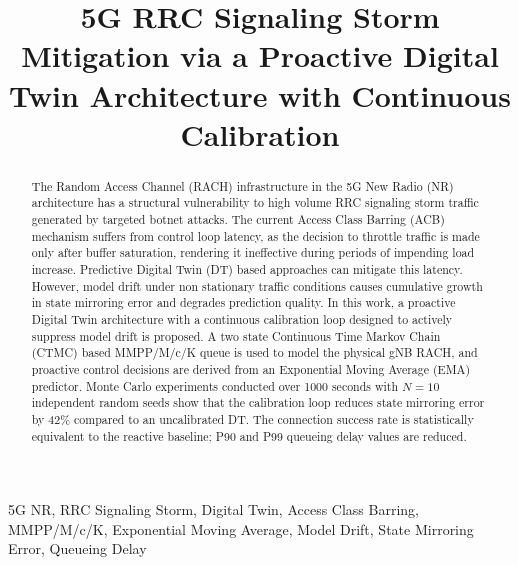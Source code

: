 \documentclass[conference]{IEEEtran}
\begin{document}

\title{5G RRC Signaling Storm Mitigation via a Proactive Digital Twin Architecture with Continuous Calibration}

\author{%
}

\maketitle

\begin{abstract}
The Random Access Channel (RACH) infrastructure in the 5G New Radio (NR) architecture has a structural vulnerability to high volume RRC signaling storm traffic generated by targeted botnet attacks. The current Access Class Barring (ACB) mechanism suffers from control loop latency, as the decision to throttle traffic is made only after buffer saturation, rendering it ineffective during periods of impending load increase. Predictive Digital Twin (DT) based approaches can mitigate this latency. However, model drift under non stationary traffic conditions causes cumulative growth in state mirroring error and degrades prediction quality. In this work, a proactive Digital Twin architecture with a continuous calibration loop designed to actively suppress model drift is proposed. A two state Continuous Time Markov Chain (CTMC) based MMPP/M/c/K queue is used to model the physical gNB RACH, and proactive control decisions are derived from an Exponential Moving Average (EMA) predictor. Monte Carlo experiments conducted over 1000 seconds with $N=10$ independent random seeds show that the calibration loop reduces state mirroring error by 42\% compared to an uncalibrated DT. The connection success rate is statistically equivalent to the reactive baseline; P90 and P99 queueing delay values are reduced.
\end{abstract}

\begin{IEEEkeywords}
5G NR, RRC Signaling Storm, Digital Twin, Access Class Barring, MMPP/M/c/K, Exponential Moving Average, Model Drift, State Mirroring Error, Queueing Delay
\end{IEEEkeywords}
\end{document}
